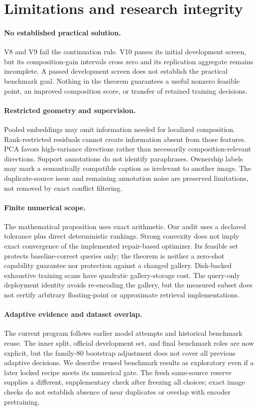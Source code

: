 \documentclass[11pt]{article}
\begin{document}
\section{Limitations and research integrity}
\paragraph{No established practical solution.}
V8 and V9 fail the continuation rule. V10 passes its initial development
screen, but its composition-gain intervals cross zero and its replication
aggregate remains incomplete. A passed development screen does not
establish the practical benchmark goal. Nothing in the theorem guarantees
a useful nonzero feasible point,
an improved composition score, or transfer of retained training decisions.

\paragraph{Restricted geometry and supervision.}
Pooled embeddings may omit information needed for localized composition.
Rank-restricted residuals cannot create information absent from those
features. PCA favors high-variance directions rather than necessarily
composition-relevant directions. Support annotations do not identify
paraphrases. Ownership labels may mark a semantically compatible caption
as irrelevant to another image. The duplicate-source issue and remaining
annotation noise are preserved limitations, not removed by exact conflict
filtering.

\paragraph{Finite numerical scope.}
The mathematical proposition uses exact arithmetic. Our audit uses a
declared tolerance plus direct deterministic rankings. Strong convexity
does not imply exact convergence of the implemented repair-based optimizer.
Its feasible set protects baseline-correct queries only; the theorem is
neither a zero-shot capability guarantee nor protection against a changed
gallery. Disk-backed exhaustive training scans have quadratic gallery-storage
cost. The query-only deployment identity avoids re-encoding the gallery,
but the measured subset does not certify arbitrary floating-point or
approximate retrieval implementations.

\paragraph{Adaptive evidence and dataset overlap.}
The current program follows earlier model attempts and historical benchmark
reuse. The inner split, official development set, and final benchmark
roles are now explicit, but the family-80 bootstrap adjustment does not
cover all previous adaptive decisions. We describe reused benchmark
results as exploratory even if a later locked recipe meets its numerical
gate. The fresh same-source reserve supplies a different, supplementary
check after freezing all choices; exact image checks do not establish
absence of near duplicates or overlap with encoder pretraining.
\end{document}
